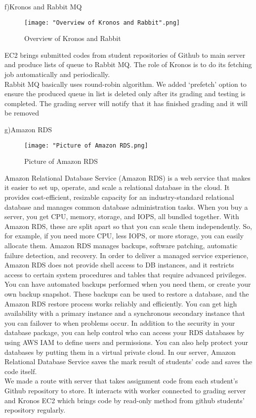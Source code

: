 \documentclass[10pt,journal,compsoc]{IEEEtran}
\begin{document}
\null\qquad 	f)Kronos and Rabbit MQ
\begin{figure}[H]
\centering
\texttt{[image: "Overview of Kronos and Rabbit".png]}
{\caption*{Overview of Kronos and Rabbit}}
\end{figure}
EC2 brings submitted codes from student repositories of Github to main server and produce lists of queue to Rabbit MQ. The role of Kronos is to do its fetching job automatically and periodically.\\
\null\qquad Rabbit MQ basically uses round-robin algorithm. We added ‘prefetch’ option to ensure the produced queue in list is deleted only after its grading and testing is completed. The grading server will notify that it has finished grading and it will be removed 

\null\qquad g)Amazon RDS
\begin{figure}[H]
\centering
\texttt{[image: "Picture of Amazon RDS.png]}
{\caption*{Picture of Amazon RDS}}
\end{figure}
Amazon Relational Database Service (Amazon RDS) is a web service that makes it easier to set up, operate, and scale a relational database in the cloud. It provides cost-efficient, resizable capacity for an industry-standard relational database and manages common database administration tasks. When you buy a server, you get CPU, memory, storage, and IOPS, all bundled together. With Amazon RDS, these are split apart so that you can scale them independently. So, for example, if you need more CPU, less IOPS, or more storage, you can easily allocate them. Amazon RDS manages backups, software patching, automatic failure detection, and recovery. In order to deliver a managed service experience, Amazon RDS does not provide shell access to DB instances, and it restricts access to certain system procedures and tables that require advanced privileges. You can have automated backups performed when you need them, or create your own backup snapshot. These backups can be used to restore a database, and the Amazon RDS restore process works reliably and efficiently. You can get high availability with a primary instance and a synchronous secondary instance that you can failover to when problems occur. In addition to the security in your database package, you can help control who can access your RDS databases by using AWS IAM to define users and permissions. You can also help protect your databases by putting them in a virtual private cloud. In our server, Amazon Relational Database Service saves the mark result of students’ code and saves the code itself.\\
\null\qquad We made a route with server that takes assignment code from each student’s Github repository to store. It interacts with worker connected to grading server and Kronos EC2 which brings code by read-only method from github students’ repository regularly.
\end{document}

